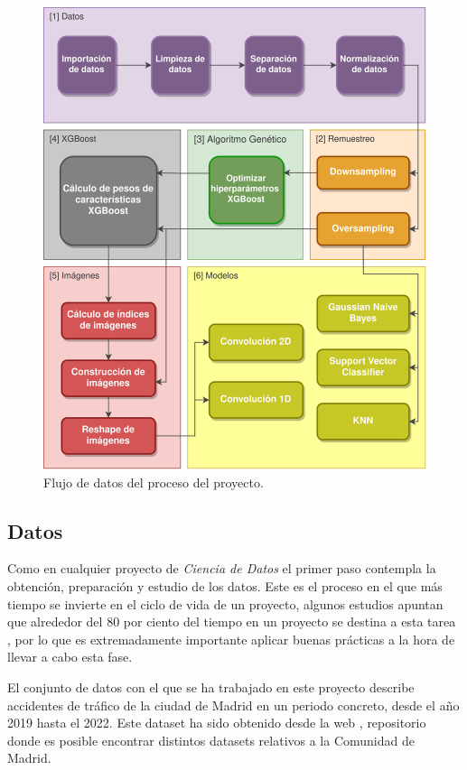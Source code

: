     \begin{figure}[H]
        \centering
        \includegraphics[width=15cm]{archivos/4.Metodologia/DataflowImageESP}
        \caption{Flujo de datos del proceso del proyecto.}
        \label{DataflowImage}
    \end{figure}



    \subsection{Datos}


            Como en cualquier proyecto de \textit{Ciencia de Datos} el primer paso contempla la obtención, preparación y estudio de los datos. Este es el proceso en el que más tiempo se invierte en el ciclo de vida de un proyecto, algunos estudios apuntan que alrededor del 80 por ciento del tiempo en un proyecto se destina a esta tarea \cite{LifecycleDataScienceProjectsTimes}, por lo que es extremadamente importante aplicar buenas prácticas a la hora de llevar a cabo esta fase.

            El conjunto de datos con el que se ha trabajado en este proyecto describe accidentes de tráfico de la ciudad de Madrid en un periodo concreto, desde el año 2019 hasta el 2022. Este dataset ha sido obtenido desde la web \cite{DatasetMadrid}, repositorio donde es posible encontrar distintos datasets relativos a la Comunidad de Madrid.

